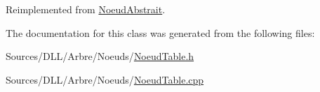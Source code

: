 Reimplemented from \hyperlink{group__inf2990_ga2e40156a7ff6dd734c61de990db1bfe0}{Noeud\+Abstrait}.



The documentation for this class was generated from the following files\+:\begin{DoxyCompactItemize}
\item 
Sources/\+D\+L\+L/\+Arbre/\+Noeuds/\hyperlink{_noeud_table_8h}{Noeud\+Table.\+h}\item 
Sources/\+D\+L\+L/\+Arbre/\+Noeuds/\hyperlink{_noeud_table_8cpp}{Noeud\+Table.\+cpp}\end{DoxyCompactItemize}
